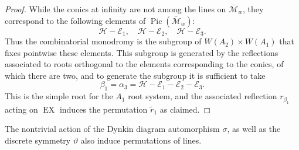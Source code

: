 \documentclass[a4paper,reqno]{amsart}
\numberwithin{equation}{section}
\newcommand{\E}{\mathcal{E}}
\newcommand{\h}{\mathcal{H}}
\newcommand{\Pic}{\operatorname{Pic}}
\numberwithin{equation}{section}
\begin{document}
\begin{proof}
While the conics at infinity are not among the lines on $\overline{\mathcal{M}}_w$, they correspond to the following elements of $\Pic(\overline{\mathcal{M}}_w)$:
$$ \h-\E_1, \quad \h-\E_2, \quad \h-\E_3.$$
Thus the combinatorial monodromy is the subgroup of $W(A_2)\times W(A_1)$ that fixes pointwise these elements. 
This subgroup is generated by the reflections associated to roots orthogonal to the elements corresponding to the conics, of which there are two, and to generate the subgroup it is sufficient to take 
$$ \beta_1 = \alpha_3 = \h-\E_1-\E_2-\E_3.$$
 This is the simple root for the $A_1$ root system, and the associated reflection $r_{\beta_1}$ acting on $\operatorname{EX}$ induces the permutation $\tilde{r}_1$ as claimed. 
\end{proof}

The nontrivial action of the Dynkin diagram automorphism $\sigma$, as well as the discrete symmetry $\vartheta$ also induce permutations of lines.
\end{document}
